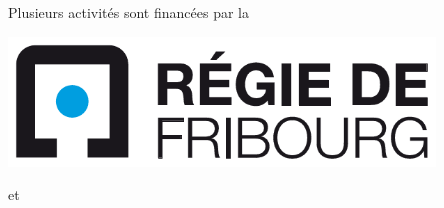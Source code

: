 \cleardoublepage

\thispagestyle{empty}%

\clearpage

\begin{center}
{\Huge Plusieurs activités sont financées par la}
\vspace*{5mm}
\par
\includegraphics[width=0.85\textwidth]{regie_fribourg.pdf}
\end{center}

\vfill
\begin{center}
	{\Huge et}
\end{center}
\vfill

